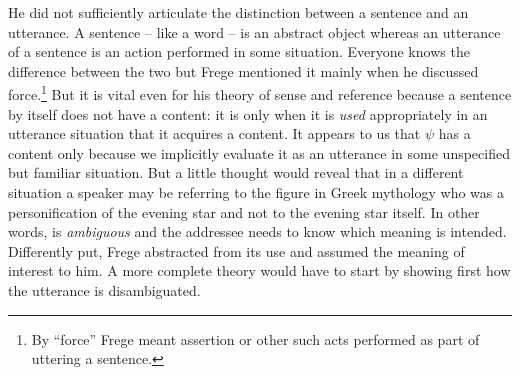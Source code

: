 He did not sufficiently articulate the distinction between a sentence and an utterance. A sentence -- like a word -- is an abstract object whereas an utterance of a sentence is an action performed in some situation. Everyone knows the difference between the two but Frege mentioned it mainly when he discussed force.\footnote{By ``force'' Frege meant assertion or other such acts performed as part of uttering a sentence.} But it is vital even for his theory of sense and reference because a sentence by itself does not have a content: it is only when it is \emph{used} appropriately in an utterance situation that it acquires a content. It appears to us that $\psi$ has a content only because we implicitly evaluate it as an utterance in some unspecified but familiar situation. But a little thought would reveal that in a different situation a speaker may be referring to the figure in Greek mythology who was a personification of the evening star and not to the evening star itself. In other words,  is \emph{ambiguous} and the addressee needs to know which meaning is intended. Differently put, Frege abstracted from its use and assumed the meaning of interest to him. A more complete theory would have to start by showing first how the utterance is disambiguated.

